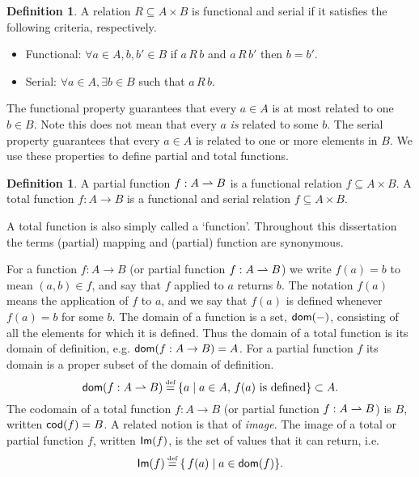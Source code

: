\documentclass[12pt,phd,lfcs,twoside,openright,logo,leftchapter,normalheadings]{infthesis}
\theoremstyle{plain}
\theoremstyle{definition}
\newtheorem{definition}[theorem]{Definition}
\begin{document}
\begin{definition}
  A relation $R \subseteq A \times B$ is functional and serial if it
  satisfies the following criteria, respectively.
  \begin{itemize}
    \item Functional: $\forall a \in A, b,b' \in B$ if  $a\,R\,b$ and $a\,R\,b'$ then $b = b'$.
    \item Serial: $\forall a \in A,\exists b \in B$ such that
      $a\,R\,b$.
  \end{itemize}
\end{definition}
%
The functional property guarantees that every $a \in A$ is at most
related to one $b \in B$. Note this does not mean that every $a$
\emph{is} related to some $b$. The serial property guarantees that
every $a \in A$ is related to one or more elements in $B$.
%
We use these properties to define partial and total functions.
%
\begin{definition}
  A partial function $f : A \rightharpoonup B$ is a functional relation
  $f \subseteq A \times B$.
  A total function $f : A \to B$ is a functional and serial relation
  $f \subseteq A \times B$.
\end{definition}
%
A total function is also simply called a `function'. Throughout this
dissertation the terms (partial) mapping and (partial) function are
synonymous.
%

For a function $f : A \to B$ (or partial function $f : A \rightharpoonup B$) we
write $f(a) = b$ to mean $(a, b) \in f$, and say that $f$ applied to
$a$ returns $b$. The notation $f(a)$ means the application of $f$ to
$a$, and we say that $f(a)$ is defined whenever $f(a) = b$ for some
$b$.
%
The domain of a function is a set, $\mathsf{dom}(-)$, consisting of all the
elements for which it is defined. Thus the domain of a total function
is its domain of definition, e.g. $\mathsf{dom}(f : A \to B) = A$.
%
For a partial function $f$ its domain is a proper subset of the domain
of definition.
%
\[
  \dom(f : A \pto B) \defas \{ a \mid a \in A,\, f(a) \text{ is defined} \} \subset A.
\]
%
The codomain of a total function $f : A \to B$ (or partial function
$f : A \rightharpoonup B$) is $B$, written $\mathsf{cod}(f) = B$. A related notion
is that of \emph{image}. The image of a total or partial function $f$,
written $\mathsf{Im}(f)$, is the set of values that it can return, i.e.
%
\[
    \dec{Im}(f) \defas \{\, f(a) \mid a \in \dom(f) \}.
\]
\end{document}
